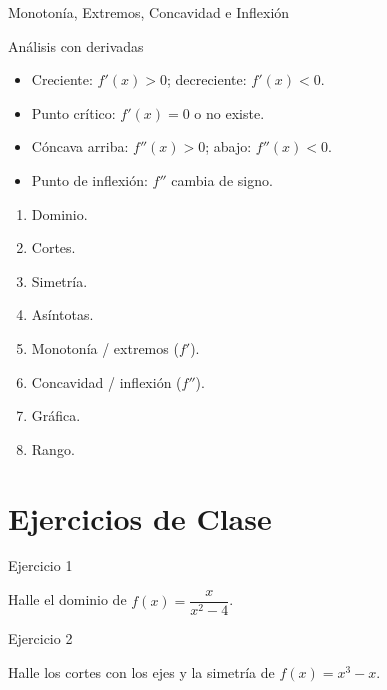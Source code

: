 \documentclass[aspectratio=169]{beamer}
\begin{document}
\begin{frame}{Monotonía, Extremos, Concavidad e Inflexión}
  \begin{block}{Análisis con derivadas}
    \begin{itemize}
      \item Creciente: $f'(x)>0$; decreciente: $f'(x)<0$.
      \item Punto crítico: $f'(x)=0$ o no existe.
      \item Cóncava arriba: $f''(x)>0$; abajo: $f''(x)<0$.
      \item Punto de inflexión: $f''$ cambia de signo.
    \end{itemize}
  \end{block}
  \vspace{6pt}
  \begin{mwpasos}[Pasos]
    \begin{enumerate}
      \item Dominio.
      \item Cortes.
      \item Simetría.
      \item Asíntotas.
      \item Monotonía / extremos ($f'$).
      \item Concavidad / inflexión ($f''$).
      \item Gráfica.
      \item Rango.
    \end{enumerate}
  \end{mwpasos}
\end{frame}

\section{Ejercicios de Clase}

\begin{frame}{Ejercicio 1}
  \begin{mwejercicio}
    Halle el dominio de $f(x) = \dfrac{x}{x^2 - 4}$.
  \end{mwejercicio}
\end{frame}

\begin{frame}{Ejercicio 2}
  \begin{mwejercicio}
    Halle los cortes con los ejes y la simetría de $f(x) = x^3 - x$.
  \end{mwejercicio}
\end{frame}
\end{document}
